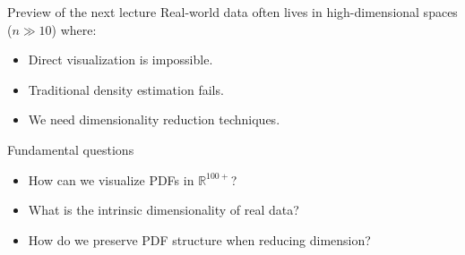\documentclass{beamer}
\begin{document}
\begin{frame}{Preview of the next lecture}
Real-world data often lives in high-dimensional spaces ($n \gg 10$) where:
\vspace{0.3cm}
\begin{itemize}
\item Direct visualization is impossible.
\vspace{0.5cm}
\item Traditional density estimation fails.
\vspace{0.5cm}
\item We need \alert{dimensionality reduction} techniques.
\end{itemize}
\vspace{0.3cm}\pause
\begin{block}{Fundamental questions}
\begin{itemize}
\item How can we visualize PDFs in $\mathbb{R}^{100+}$?
\vspace{0.5cm}
\item What is the intrinsic dimensionality of real data?
\vspace{0.5cm}
\item How do we preserve PDF structure when reducing dimension?
\end{itemize}
\end{block}
\end{frame}
\end{document}
